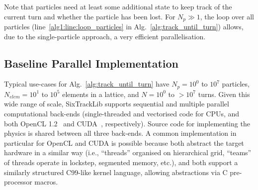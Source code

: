\documentclass[a4paper,
               refpage,       %
               keeplastbox,   %
               ]{jacow}
\begin{document}
Note that particles need at least some additional state to keep track of the current turn and whether the particle has been lost. For $N_{p} \gg 1$, the loop over all particles (line~\ref{alg1:line:loop_particles} in Alg.~\ref{alg:track_until_turn}) allows, due to the single-particle approach, a very efficient parallelisation. 

\subsection{Baseline Parallel Implementation}
Typical use-cases for Alg.~\ref{alg:track_until_turn} have $N_{p} =  10^0$ to $10^7$ particles, $N_{elem} = 10^1$ to $10^5$ elements in a lattice, and $N = 10^0$ to $>10^7$ turns. Given this wide range of scale, SixTrackLib supports sequential and multiple parallel computational back-ends (single-threaded and vectorised code for CPUs, and both OpenCL 1.2~\cite{stone-opencl-2010} and CUDA~\cite{nickolls-cuda-2008}, respectively). Source code for implementing the physics is shared between all three back-ends. A common implementation in particular for OpenCL and CUDA is possible because both
abstract the target hardware in a similar way (i.e., ``threads'' organised on hierarchical grid, ``teams'' of threads operate in lockstep, segmented memory, etc.), and both support a similarly structured C99-like kernel language, allowing abstractions via C pre-processor macros.
\end{document}
